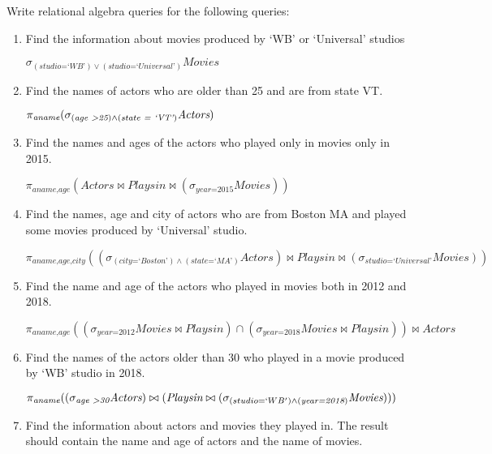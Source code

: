 \documentclass[letterpaper, 11pt]{article}
\begin{document}
Write relational algebra queries for the following queries:
\begin{enumerate}[label={\alph*})]
    \item Find the information about movies produced by `WB' or `Universal' studios
    
    $\sigma_{(\textit{studio=`WB'}) \vee (\textit{studio=`Universal'})}\textit{Movies}$
    
    \item Find the names of actors who are older than 25 and are from state VT.

    $\pi_{\textit{aname}}(\sigma_{(\textit{age \textgreater 25}) \wedge (\textit{state = `VT'})}\textit{Actors})$
    
    \item Find the names and ages of the actors who played only in movies only in 2015.

    $\pi_{\textit{aname,age}}(\textit{Actors} \bowtie \textit{Playsin} \bowtie (\sigma_{\textit{year=2015}}\textit{Movies}))$
    
    \item Find the names, age and city of actors who are from Boston MA and played some movies produced by `Universal' studio.

    $\pi_{\textit{aname,age,city}}((\sigma_{(\textit{city=`Boston'})\wedge (\textit{state=`MA'})}\textit{Actors}) \bowtie \textit{Playsin} \bowtie (\sigma_{\textit{studio=`Universal'}}\textit{Movies}))$
    
    \item Find the name and age of the actors who played in movies both in 2012 and 2018.

    $\pi_{\textit{aname,age}}((\sigma_{\textit{year=2012}}\textit{Movies} \bowtie \textit{Playsin}) \cap (\sigma_{\textit{year=2018}}\textit{Movies} \bowtie \textit{Playsin})) \bowtie \textit{Actors}$
    
    \item Find the names of the actors older than 30 who played in a movie produced by `WB' studio in 2018.

    $\pi_{\textit{aname}}((\sigma_{\textit{age \textgreater 30}}\textit{Actors}) \bowtie (\textit{Playsin} \bowtie (\sigma_{(studio=`WB') \wedge (\textit{year=2018})}\textit{Movies})))$
    
    \item Find the information about actors and movies they played in. The result should contain the name and age of actors and the name of movies.


\end{enumerate}
\end{document}
